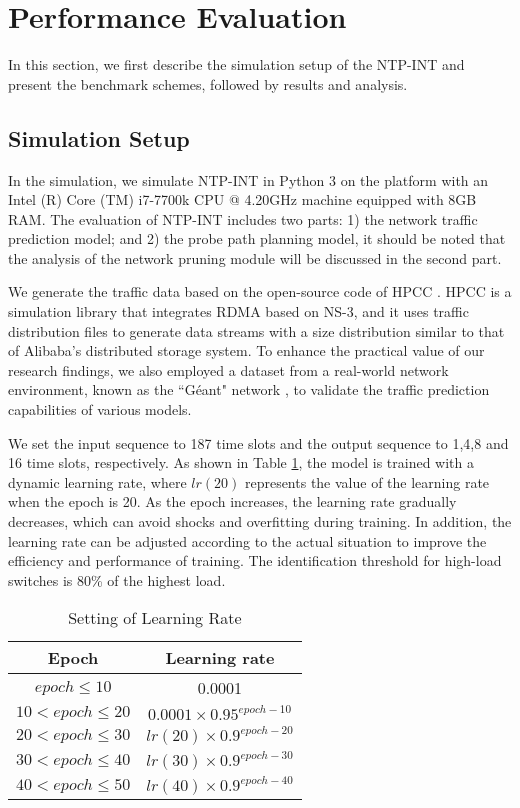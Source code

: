 \documentclass[journal]{IEEEtran}
\begin{document}
\vspace{-0.4em}
\section{Performance Evaluation}
\label{section7}

In this section, we first describe the simulation setup of the NTP-INT and present the benchmark schemes, followed by results and analysis.


\subsection{Simulation Setup}

In the simulation, we simulate NTP-INT in Python 3 on the platform with an Intel (R) Core (TM) i7-7700k CPU @ 4.20GHz machine equipped with 8GB RAM. The evaluation of NTP-INT includes two parts: 1) the network traffic prediction model; and 2) the probe path planning model, it should be noted that the analysis of the network pruning module will be discussed in the second part.

We generate the traffic data based on the open-source code of HPCC \cite{2}. HPCC is a simulation library that integrates RDMA based on NS-3, and it uses traffic distribution files to generate data streams with a size distribution similar to that of Alibaba's distributed storage system.
To enhance the practical value of our research findings, we also employed a dataset from a real-world network environment, known as the ``Géant" network \cite{47}, to validate the traffic prediction capabilities of various models.

We set the input sequence to 187 time slots and the output sequence to 1,4,8 and 16 time slots, respectively. As shown in Table \ref{tab1}, the model is trained with a dynamic learning rate, where $lr\left( 20 \right)$ represents the value of the learning rate when the epoch is 20. As the epoch increases, the learning rate gradually decreases, which can avoid shocks and overfitting during training. In addition, the learning rate can be adjusted according to the actual situation to improve the efficiency and performance of training. The identification threshold for high-load switches is 80\% of the highest load.

\begin{table}[htbp]  
  \centering  
  \caption{Setting of Learning Rate}  
  \label{tab1}  
  \begin{tabular}{cc}  
    \toprule %
    Epoch & Learning rate  \\  
    \midrule %
    $epoch\le 10$ & 0.0001  \\  
    $10<epoch\le 20$ & $0.0001\times {{0.95}^{epoch-10}}$  \\ 
    $20<epoch\le 30$ & $lr\left( 20 \right)\times {{0.9}^{epoch-20}}$  \\ 
    $30<epoch\le 40$ & $lr\left( 30 \right)\times {{0.9}^{epoch-30}}$  \\ 
    $40<epoch\le 50$ & $lr\left( 40 \right)\times {{0.9}^{epoch-40}}$  \\ 
    \bottomrule %
  \end{tabular}  
\end{table}  
\end{document}
